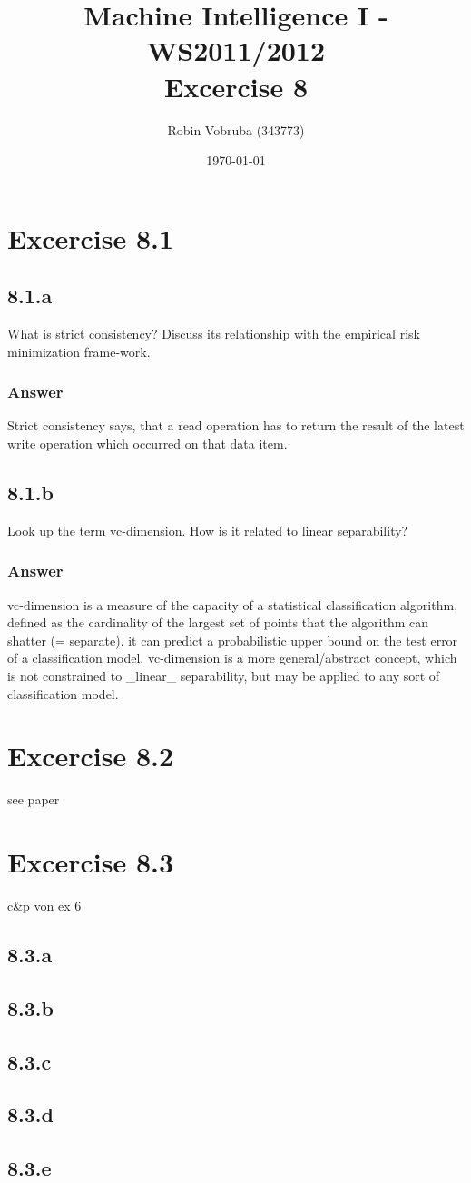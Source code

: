 \documentclass[a4paper,headings=small]{scrartcl}
\title{Machine Intelligence I - WS2011/2012\\Excercise 8}
\author{Robin Vobruba (343773)}
\date{\today}
\begin{document}
\maketitle


\section{Excercise 8.1}

\subsection{8.1.a}
What is strict consistency?
Discuss its relationship with the empirical risk minimization frame-work.
\subsubsection{Answer}
Strict consistency says, that a read operation has to return the result
of the latest write operation which occurred on that data item.

\subsection{8.1.b}
Look up the term vc-dimension.
How is it related to linear separability?
\subsubsection{Answer}
vc-dimension is a measure of the capacity of a statistical classification
algorithm, defined as the cardinality of the largest set of points
that the algorithm can shatter (= separate).
it can predict a probabilistic upper bound on the test error of a classification model.
vc-dimension is a more general/abstract concept, which is not constrained
to _linear_ separability, but may be applied to any sort of classification model.


\section{Excercise 8.2}

see paper

\section{Excercise 8.3}
c&p von ex 6

\subsection{8.3.a}

\subsection{8.3.b}

\subsection{8.3.c}

\subsection{8.3.d}

\subsection{8.3.e}
\end{document}
